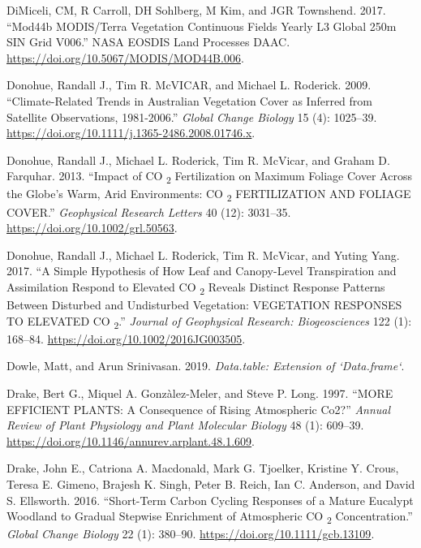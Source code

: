 \documentclass[
]{article}
\newlength{\cslhangindent}
\newlength{\cslentryspacingunit} %
\newenvironment{CSLReferences}[2] %
 {%
  \setlength{\parindent}{0pt}
  \ifodd #1
  \let\oldpar\par
  \def\par{\hangindent=\cslhangindent\oldpar}
  \fi
  \setlength{\parskip}{#2\cslentryspacingunit}
 }%
 {}
\begin{document}
\begin{CSLReferences}{1}{0}
\leavevmode{}%
DiMiceli, CM, R Carroll, DH Sohlberg, M Kim, and JGR Townshend. 2017.
{``{Mod44b MODIS}/{Terra Vegetation Continuous Fields Yearly L3 Global}
250m {SIN Grid V006}.''} {NASA EOSDIS Land Processes DAAC}.
\url{https://doi.org/10.5067/MODIS/MOD44B.006}.

\leavevmode{}%
Donohue, Randall J., Tim R. McVICAR, and Michael L. Roderick. 2009.
{``Climate-Related Trends in {Australian} Vegetation Cover as Inferred
from Satellite Observations, 1981-2006.''} \emph{Global Change Biology}
15 (4): 1025--39.
\url{https://doi.org/10.1111/j.1365-2486.2008.01746.x}.

\leavevmode{}%
Donohue, Randall J., Michael L. Roderick, Tim R. McVicar, and Graham D.
Farquhar. 2013. {``Impact of {CO} {\textsubscript{2}} Fertilization on
Maximum Foliage Cover Across the Globe's Warm, Arid Environments: {CO}
{\textsubscript{2}} {FERTILIZATION AND FOLIAGE COVER}.''}
\emph{Geophysical Research Letters} 40 (12): 3031--35.
\url{https://doi.org/10.1002/grl.50563}.

\leavevmode{}%
Donohue, Randall J., Michael L. Roderick, Tim R. McVicar, and Yuting
Yang. 2017. {``A Simple Hypothesis of How Leaf and Canopy-Level
Transpiration and Assimilation Respond to Elevated {CO}
{\textsubscript{2}} Reveals Distinct Response Patterns Between Disturbed
and Undisturbed Vegetation: {VEGETATION RESPONSES TO ELEVATED CO}
{\textsubscript{2}}.''} \emph{Journal of Geophysical Research:
Biogeosciences} 122 (1): 168--84.
\url{https://doi.org/10.1002/2016JG003505}.

\leavevmode{}%
Dowle, Matt, and Arun Srinivasan. 2019. \emph{Data.table: {Extension} of
`Data.frame`}.

\leavevmode{}%
Drake, Bert G., Miquel A. Gonzàlez-Meler, and Steve P. Long. 1997.
{``{MORE EFFICIENT PLANTS}: {A Consequence} of {Rising Atmospheric
Co2}?''} \emph{Annual Review of Plant Physiology and Plant Molecular
Biology} 48 (1): 609--39.
\url{https://doi.org/10.1146/annurev.arplant.48.1.609}.

\leavevmode{}%
Drake, John E., Catriona A. Macdonald, Mark G. Tjoelker, Kristine Y.
Crous, Teresa E. Gimeno, Brajesh K. Singh, Peter B. Reich, Ian C.
Anderson, and David S. Ellsworth. 2016. {``Short-Term Carbon Cycling
Responses of a Mature Eucalypt Woodland to Gradual Stepwise Enrichment
of Atmospheric {CO} {\textsubscript{2}} Concentration.''} \emph{Global
Change Biology} 22 (1): 380--90.
\url{https://doi.org/10.1111/gcb.13109}.


\end{CSLReferences}
\end{document}
